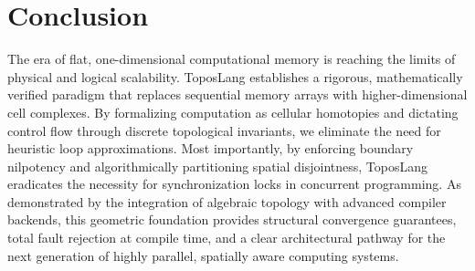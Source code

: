 \documentclass[11pt, a4paper]{article}
\begin{document}
\section{Conclusion}
The era of flat, one-dimensional computational memory is reaching the limits of physical and logical scalability. ToposLang establishes a rigorous, mathematically verified paradigm that replaces sequential memory arrays with higher-dimensional cell complexes. By formalizing computation as cellular homotopies and dictating control flow through discrete topological invariants, we eliminate the need for heuristic loop approximations. Most importantly, by enforcing boundary nilpotency and algorithmically partitioning spatial disjointness, ToposLang eradicates the necessity for synchronization locks in concurrent programming. As demonstrated by the integration of algebraic topology with advanced compiler backends, this geometric foundation provides structural convergence guarantees, total fault rejection at compile time, and a clear architectural pathway for the next generation of highly parallel, spatially aware computing systems.
\end{document}
